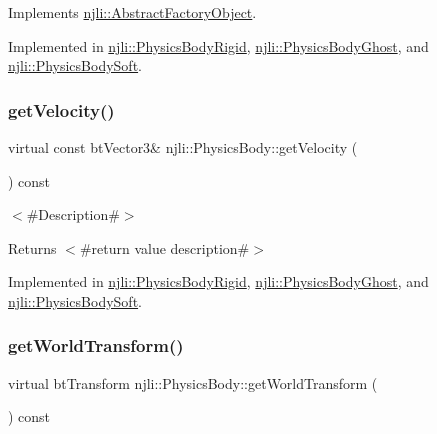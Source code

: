 Implements \mbox{\hyperlink{classnjli_1_1_abstract_factory_object_a207c86146d40d0794708ae7f2d4e60a7}{njli\+::\+Abstract\+Factory\+Object}}.



Implemented in \mbox{\hyperlink{classnjli_1_1_physics_body_rigid_a701c7a02bd440b03982d7f9509baca03}{njli\+::\+Physics\+Body\+Rigid}}, \mbox{\hyperlink{classnjli_1_1_physics_body_ghost_a8b7a0599b7da88fbcf61451dc066748f}{njli\+::\+Physics\+Body\+Ghost}}, and \mbox{\hyperlink{classnjli_1_1_physics_body_soft_adfe628fd5ab43df08332362414d72b2a}{njli\+::\+Physics\+Body\+Soft}}.

\mbox{\label{classnjli_1_1_physics_body_add437a6d229dfbf74a838d0de7229867}} 
\subsubsection{\texorpdfstring{get\+Velocity()}{getVelocity()}}
{\footnotesize\ttfamily virtual const bt\+Vector3\& njli\+::\+Physics\+Body\+::get\+Velocity (\begin{DoxyParamCaption}{ }\end{DoxyParamCaption}) const\hspace{0.3cm}{\ttfamily [pure virtual]}}

$<$\#\+Description\#$>$

\begin{DoxyReturn}{Returns}
$<$\#return value description\#$>$ 
\end{DoxyReturn}


Implemented in \mbox{\hyperlink{classnjli_1_1_physics_body_rigid_abbd7a0ea7ee539d9b84c64859ddf8406}{njli\+::\+Physics\+Body\+Rigid}}, \mbox{\hyperlink{classnjli_1_1_physics_body_ghost_aee53dbc6a3aba8ab33c10e3523f1f4dc}{njli\+::\+Physics\+Body\+Ghost}}, and \mbox{\hyperlink{classnjli_1_1_physics_body_soft_af8cbddbeb15e03ebdf1e6000d7abb6a4}{njli\+::\+Physics\+Body\+Soft}}.

\mbox{\label{classnjli_1_1_physics_body_ae8501b09e0eda9f0f82069c537f16663}} 
\subsubsection{\texorpdfstring{get\+World\+Transform()}{getWorldTransform()}}
{\footnotesize\ttfamily virtual bt\+Transform njli\+::\+Physics\+Body\+::get\+World\+Transform (\begin{DoxyParamCaption}{ }\end{DoxyParamCaption}) const\hspace{0.3cm}{\ttfamily [virtual]}}

